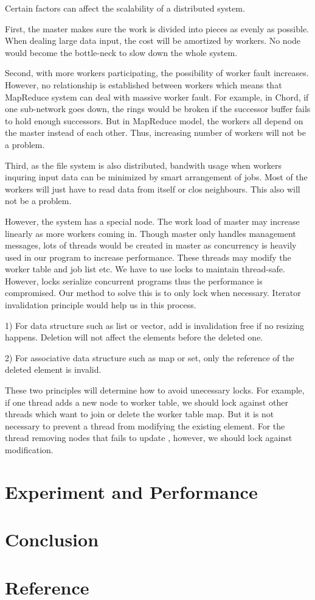 \documentclass[12pt]{article}
\begin{document}
Certain factors can affect the scalability of a distributed system.
 
First, the master makes sure the work is divided into pieces as evenly as possible. When dealing large data input, the cost will be amortized by
workers. No node would become the bottle-neck to slow down the whole system.
 
Second, with more workers participating, the possibility of worker fault increases. However, no relationship is established between workers which means that MapReduce system can deal with massive worker fault. For example, in Chord, if one sub-network goes down, the rings would be broken if the successor buffer fails to hold enough successors. But in MapReduce model, the workers all depend on the master instead of each other. Thus, increasing number of workers will not be a problem.

Third, as the file system is also distributed, bandwith usage when workers inquring input data can be minimized by smart arrangement of jobs. Most of the workers will just have to read data from itself or clos neighbours. This also will not be a problem. 

However, the system has a special node. The work load of master may increase linearly as more workers coming in. Though master only handles management messages, lots of threads would be created in master as concurrency is heavily used in our program to increase performance. These threads may modify the worker table and job list etc. We have to use locks to maintain thread-safe. However, locks serialize concurrent programs thus the performance is compromised. Our method to solve this is to only lock when necessary. Iterator invalidation principle would help us in this process.

1) For data structure such as list or vector, add is invalidation free if no resizing happens. Deletion will not affect the elements before the deleted one.

2) For associative data structure such as map or set, only the reference of the deleted element is invalid.

These two principles will determine how to avoid unecessary locks. For example, if one thread adds a new node to worker table, we should lock against other threads which want to join or delete the worker table map. But it is not necessary to prevent a thread from modifying the existing element. For the thread removing nodes that fails to update , however, we should lock against modification.        
   

\section{Experiment and Performance }

\section {Conclusion}

\section*{Reference}
\end{document}
